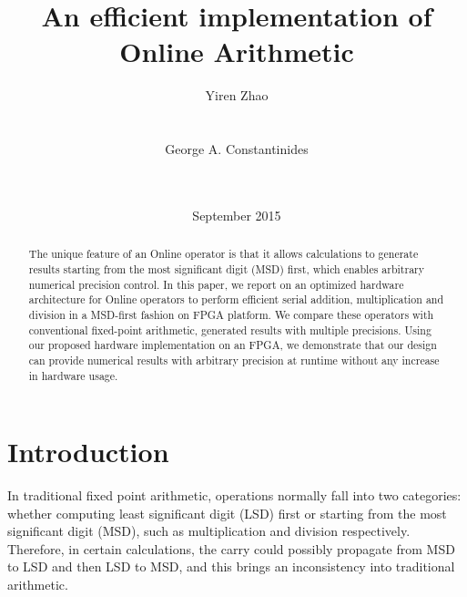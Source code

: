 \documentclass{sig-alternate}
\begin{document}
	\title{An efficient implementation of Online Arithmetic}
	
	
	\author{
		\alignauthor
		Yiren Zhao\\
		\\
		\\
		\alignauthor
		George A. Constantinides\\
		\\
		\\
	}
	\date{September 2015}
	
	\maketitle
	
	\begin{abstract}
		The unique feature of an Online operator is that it allows calculations to generate results starting from the most significant digit (MSD) first, which enables arbitrary numerical precision control. In this paper, we report on an optimized hardware architecture for Online operators to perform efficient serial addition, multiplication and division in a MSD-first fashion on FPGA platform. We compare these operators with conventional fixed-point arithmetic, generated results with multiple precisions. Using our proposed hardware implementation on an FPGA, we demonstrate that our design can provide numerical results with arbitrary precision at runtime without any increase in hardware usage. 
	\end{abstract}
	
	
	\section{Introduction}
	
	In traditional fixed point arithmetic, operations normally fall into two categories: whether computing least significant digit (LSD) first or starting from the most significant digit (MSD), such as multiplication and division respectively. Therefore, in certain calculations, the carry could possibly propagate from MSD to LSD and then LSD to MSD, and this brings an inconsistency into traditional arithmetic.
	
\end{document}
